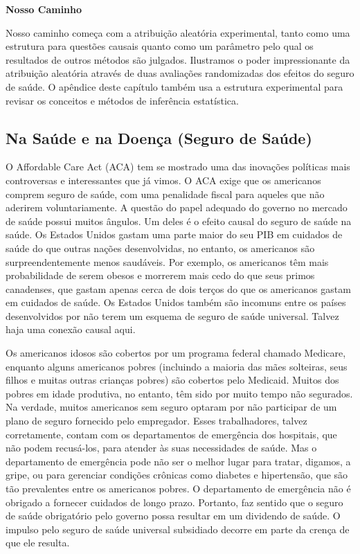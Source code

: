 \documentclass[a4paper,12pt]{article}[abntex2]
\begin{document}
\textbf{Nosso Caminho}

Nosso caminho começa com a atribuição aleatória experimental, tanto como uma estrutura para questões causais quanto como um parâmetro pelo qual os resultados de outros métodos são julgados. Ilustramos o poder impressionante da atribuição aleatória através de duas avaliações randomizadas dos efeitos do seguro de saúde. O apêndice deste capítulo também usa a estrutura experimental para revisar os conceitos e métodos de inferência estatística.

\subsection{Na Saúde e na Doença (Seguro de Saúde)}

O Affordable Care Act (ACA) tem se mostrado uma das inovações políticas mais controversas e interessantes que já vimos. O ACA exige que os americanos comprem seguro de saúde, com uma penalidade fiscal para aqueles que não aderirem voluntariamente. A questão do papel adequado do governo no mercado de saúde possui muitos ângulos. Um deles é o efeito causal do seguro de saúde na saúde. Os Estados Unidos gastam uma parte maior do seu PIB em cuidados de saúde do que outras nações desenvolvidas, no entanto, os americanos são surpreendentemente menos saudáveis. Por exemplo, os americanos têm mais probabilidade de serem obesos e morrerem mais cedo do que seus primos canadenses, que gastam apenas cerca de dois terços do que os americanos gastam em cuidados de saúde. Os Estados Unidos também são incomuns entre os países desenvolvidos por não terem um esquema de seguro de saúde universal. Talvez haja uma conexão causal aqui.

Os americanos idosos são cobertos por um programa federal chamado Medicare, enquanto alguns americanos pobres (incluindo a maioria das mães solteiras, seus filhos e muitas outras crianças pobres) são cobertos pelo Medicaid. Muitos dos pobres em idade produtiva, no entanto, têm sido por muito tempo não segurados. Na verdade, muitos americanos sem seguro optaram por não participar de um plano de seguro fornecido pelo empregador. Esses trabalhadores, talvez corretamente, contam com os departamentos de emergência dos hospitais, que não podem recusá-los, para atender às suas necessidades de saúde. Mas o departamento de emergência pode não ser o melhor lugar para tratar, digamos, a gripe, ou para gerenciar condições crônicas como diabetes e hipertensão, que são tão prevalentes entre os americanos pobres. O departamento de emergência não é obrigado a fornecer cuidados de longo prazo. Portanto, faz sentido que o seguro de saúde obrigatório pelo governo possa resultar em um dividendo de saúde. O impulso pelo seguro de saúde universal subsidiado decorre em parte da crença de que ele resulta.
\end{document}
